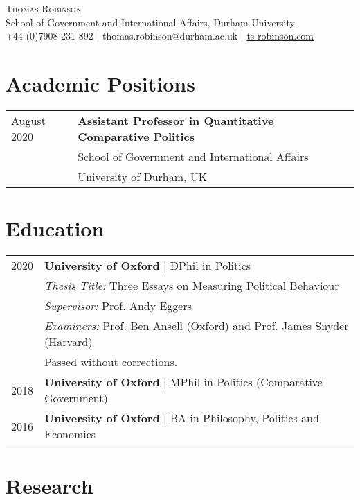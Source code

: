 \documentclass[11pt, a4paper]{article}
\begin{document}
 \begin{center}
    \textsc{\huge Thomas Robinson} \\
    School of Government and International Affairs, Durham University \\
    +44 (0)7908 231 892 $|$ thomas.robinson@durham.ac.uk $|$ \href{https://ts-robinson.com}{ts-robinson.com}
 \end{center}

\section*{Academic Positions}
\begin{tabular}{ll}
    August 2020 & \textbf{Assistant Professor in Quantitative Comparative Politics} \\
    & School of Government and International Affairs \\
    & University of Durham, UK \\

 \end{tabular}
\vspace{-1em}
 \section*{Education}
 \begin{tabular}{ll}
    2020 & \textbf{University of Oxford} $|$ DPhil in Politics \\
    	 & \textit{Thesis Title:} Three Essays on Measuring Political Behaviour \\
    	 & \textit{Supervisor:} Prof. Andy Eggers\\
    	 & \textit{Examiners:} Prof. Ben Ansell (Oxford) and Prof. James Snyder (Harvard) \\
    	 & Passed without corrections. \\
    2018  & \textbf{University of Oxford} $|$ MPhil in Politics (Comparative Government) \\
    2016 & \textbf{University of Oxford} $|$ BA in Philosophy, Politics and Economics
 \end{tabular}

 \section*{Research}

\end{document}
